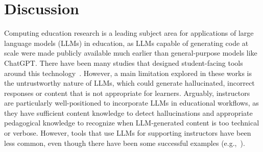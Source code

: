 \section{Discussion}



% 
Computing education research is a leading subject area for applications of large language models (LLMs) in education, as LLMs capable of generating code at scale were made publicly available much earlier than general-purpose models like ChatGPT. 
There have been many studies that designed student-facing tools around this technology~\cite{ferdowsiValidatingAIGeneratedCode2024,jinTeachAIHow2024,kazemitabaarCodeAidEvaluatingClassroom2024,logachevaEvaluatingContextuallyPersonalized2024,yangDebuggingAITutor2024,yanIvieLightweightAnchored2024}. 
However, a main limitation explored in these works is the untrustworthy nature of LLMs, which could generate hallucinated, incorrect responses or content that is not appropriate for learners.
Arguably, instructors are particularly well-positioned to incorporate LLMs in educational workflows, as they have sufficient content knowledge to detect hallucinations and appropriate pedagogical knowledge to recognize when LLM-generated content is too technical or verbose.
However, tools that use LLMs for supporting instructors have been less common, even though there have been some successful examples (e.g.,~\cite{choiVIVIDHumanAICollaborative2024a}).


